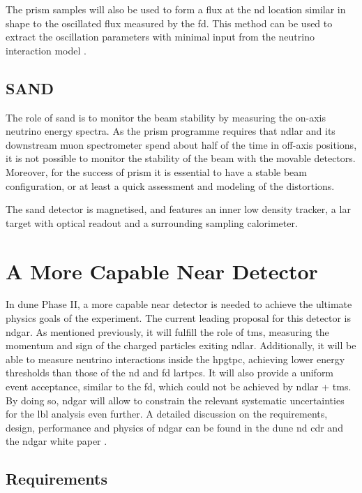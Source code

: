 The \gls{prism} samples will also be used to form a flux at the \gls{nd} location similar in shape to the oscillated flux measured by the \gls{fd}. This method can be used to extract the oscillation parameters with minimal input from the neutrino interaction model \cite{Hasnip2023}.

\subsection{SAND}

The role of \gls{sand} is to monitor the beam stability by measuring the on-axis neutrino energy spectra. As the \gls{prism} programme requires that \gls{ndlar} and its downstream muon spectrometer spend about half of the time in off-axis positions, it is not possible to monitor the stability of the beam with the movable detectors. Moreover, for the success of \gls{prism} it is essential to have a stable beam configuration, or at least a quick assessment and modeling of the distortions.

The \gls{sand} detector is magnetised, and features an inner low density tracker, a \gls{lar} target with optical readout and a surrounding sampling calorimeter.

\section{A More Capable Near Detector}\label{sec:mcnd}

In \gls{dune} Phase II, a more capable near detector is needed to achieve the ultimate physics goals of the experiment. The current leading proposal for this detector is \gls{ndgar}. As mentioned previously, it will fulfill the role of \gls{tms}, measuring the momentum and sign of the charged particles exiting \gls{ndlar}. Additionally, it will be able to measure neutrino interactions inside the \gls{hpgtpc}, achieving lower energy thresholds than those of the \gls{nd} and \gls{fd} \gls{lartpc}s. It will also provide a uniform event acceptance, similar to the \gls{fd}, which could not be achieved by \gls{ndlar} + \gls{tms}. By doing so, \gls{ndgar} will allow to constrain the relevant systematic uncertainties for the \gls{lbl} analysis even further. A detailed discussion on the requirements, design, performance and physics of \gls{ndgar} can be found in the \gls{dune} \gls{nd} \gls{cdr} \cite{DUNE2021NDCDR} and the \gls{ndgar} white paper \cite{DUNE2022GArWhite}.

\subsection{Requirements}

